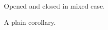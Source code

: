 \documentclass{article}
\begin{document}
\begin{Theorem}\label{thm:upper}
Opened and closed in mixed case.
\end{Theorem}

\begin{corollary}\label{cor:plain}
A plain corollary.
\end{corollary}
\end{document}
